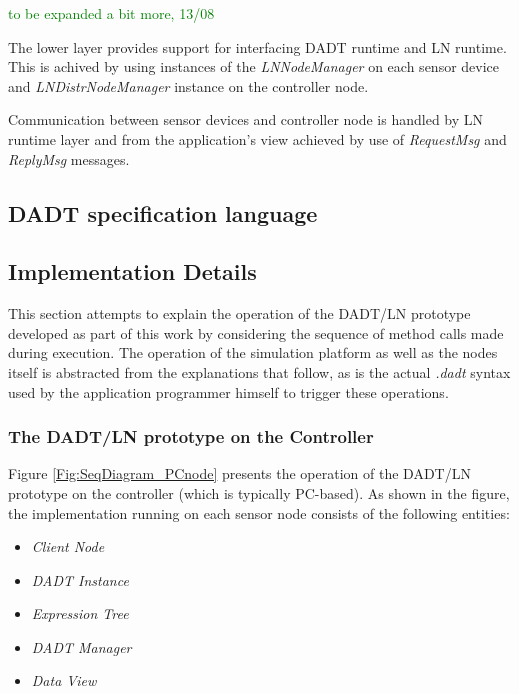 \textcolor{green}{to be expanded a bit more, 13/08}

The lower layer provides support for interfacing DADT runtime and LN runtime.
This is achived by using instances of the \emph{LNNodeManager} on each sensor
device and \emph{LNDistrNodeManager} instance on the controller node. 

Communication between sensor devices and controller node is handled by LN
runtime layer and from the application's view achieved by use of 
\emph{RequestMsg} and \emph{ReplyMsg} messages.



\subsection{DADT specification language} \label{subsec:DADTlanguage}
 

\subsection{Implementation Details}

This section attempts to explain the operation of the DADT/LN prototype
developed as part of this work by considering the sequence of method calls made
during execution. The operation of the simulation platform as well as the
nodes itself is abstracted from the explanations that follow, as is the actual
\emph{.dadt} syntax used by the application programmer himself to trigger these
operations. 

\subsubsection{The DADT/LN prototype on the Controller}

Figure \ref{Fig:SeqDiagram_PCnode} presents the operation of the DADT/LN
prototype on the controller (which is typically PC-based). As shown in the figure, the implementation running on each sensor node 
consists of the following entities:

\begin{itemize}
  \item \emph{Client Node}
  \item \emph{DADT Instance}
  \item \emph{Expression Tree} 
  \item \emph{DADT Manager} 
  \item \emph{Data View} 
\end{itemize}

